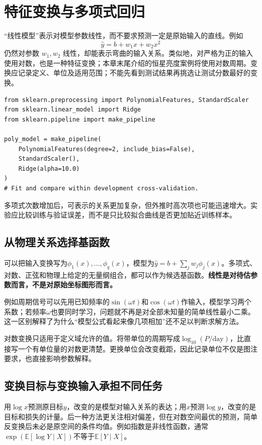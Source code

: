 \section{特征变换与多项式回归}
“线性模型”表示对模型参数线性，而不要求预测一定是原始输入的直线。例如
\begin{equation}
\hat y=b+w_1x+w_2x^2
\end{equation}
仍然对参数 $w_1,w_2$ 线性，却能表示弯曲的输入关系。类似地，对严格为正的输入使用对数，也是一种特征变换；本章末尾介绍的恒星亮度案例将使用对数周期。变换应记录定义、单位及适用范围；不能先看到测试结果再挑选让测试分数最好的变换。

\begin{lstlisting}[caption={多项式特征属于训练流程的一部分}]
from sklearn.preprocessing import PolynomialFeatures, StandardScaler
from sklearn.linear_model import Ridge
from sklearn.pipeline import make_pipeline

poly_model = make_pipeline(
    PolynomialFeatures(degree=2, include_bias=False),
    StandardScaler(),
    Ridge(alpha=10.0)
)
# Fit and compare within development cross-validation.
\end{lstlisting}

多项式次数增加后，可表示的关系更加复杂，但外推时高次项也可能迅速增大。实验应比较训练与验证误差，而不是只比较拟合曲线是否更加贴近训练样本。

\subsection{从物理关系选择基函数}
可以把输入变换写为$\phi_1(x),\ldots,\phi_q(x)$，模型为$\hat y=b+\sum_jw_j\phi_j(x)$。多项式、对数、正弦和物理上给定的无量纲组合，都可以作为候选基函数。\textbf{线性是对待估参数而言，不是对原始坐标图形而言。}

例如周期信号可以先用已知频率的$\sin(\omega t)$和$\cos(\omega t)$作输入，模型学习两个系数；若频率$\omega$也要同时学习，问题就不再是对全部未知量的简单线性最小二乘。这一区别解释了为什么“模型公式看起来像几项相加”还不足以判断求解方法。

对数变换只适用于定义域允许的值。将带单位的周期写成$\log_{10}(P/\mathrm{day})$，比直接写一个有单位量的对数更清楚。更换单位会改变截距，因此记录单位不仅是图注要求，也直接影响参数解释。

\subsection{变换目标与变换输入承担不同任务}
用$\log x$预测原目标$y$，改变的是模型对输入关系的表达；用$x$预测$\log y$，改变的是目标和损失的计量。后一种方法更关注相对偏差，但在对数空间最优的预测，简单反变换后未必是原空间的条件均值。例如指数是非线性函数，通常$\exp(\mathbb E[\log Y\mid X])$不等于$\mathbb E[Y\mid X]$。

